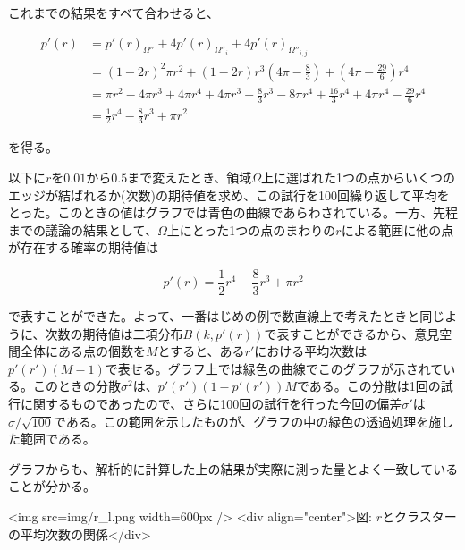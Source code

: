 これまでの結果をすべて合わせると、

$$\begin{align}
p'(r) &= p'(r)_{\Omega''} + 4p'(r)_{\Omega''_{i}} + 4p'(r)_{\Omega''_{i,j}}\\
&= (1-2r)^{2}\pi r^{2} + (1-2r)r^{3}\left( 4\pi-\frac{8}{3} \right) + \left(4\pi -\frac{29}{6}\right)r^{4}\\
&= \pi r^{2} - 4\pi r^{3} + 4\pi r^{4} + 4\pi r^{3} -\frac{8}{3}r^{3} - 8\pi r^{4} + \frac{16}{3}r^{4} + 4\pi r^{4} - \frac{29}{6}r^{4}\\
&= \frac{1}{2}r^{4} -\frac{8}{3}r^{3} + \pi r^{2}
\end{align}$$

を得る。

以下に$r$を$0.01$から$0.5$まで変えたとき、領域$\Omega$上に選ばれた1つの点からいくつのエッジが結ばれるか(次数)の期待値を求め、この試行を100回繰り返して平均をとった。このときの値はグラフでは青色の曲線であらわされている。一方、先程までの議論の結果として、$\Omega$上にとった1つの点のまわりの$r$による範囲に他の点が存在する確率の期待値は

$$p'(r) = \frac{1}{2}r^{4} -\frac{8}{3}r^{3} + \pi r^{2}$$

で表すことができた。よって、一番はじめの例で数直線上で考えたときと同じように、次数の期待値は二項分布$B(k,p'(r))$で表すことができるから、意見空間全体にある点の個数を$M$とすると、ある$r'$における平均次数は$p'(r')(M-1)$で表せる。グラフ上では緑色の曲線でこのグラフが示されている。このときの分散$\sigma^{2}$は、$p'(r')(1-p'(r'))M$である。この分散は1回の試行に関するものであったので、さらに100回の試行を行った今回の偏差$\sigma'$は$\sigma/\sqrt{100}$である。この範囲を示したものが、グラフの中の緑色の透過処理を施した範囲である。

グラフからも、解析的に計算した上の結果が実際に測った量とよく一致していることが分かる。

<img src=img/r_l.png width=600px />
<div align="center">図: $r$とクラスターの平均次数の関係</div>


